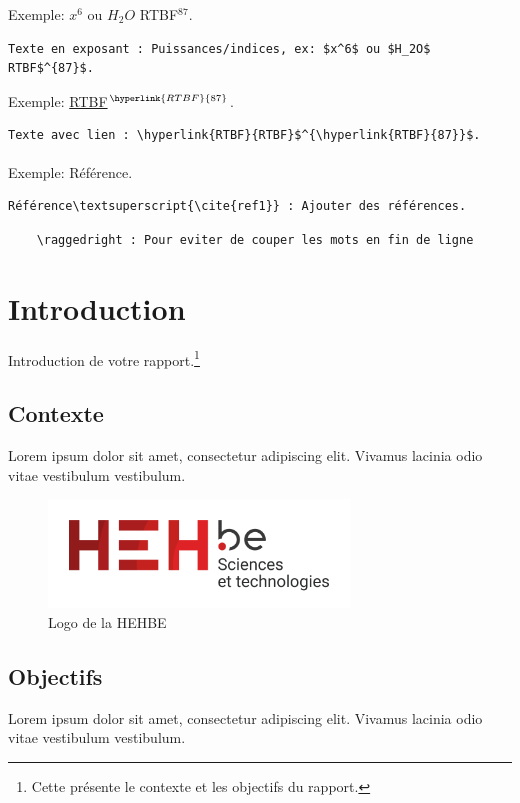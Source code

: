 Exemple: $x^6$ ou $H_2O$ RTBF$^{87}$.
\begin{verbatim}
Texte en exposant : Puissances/indices, ex: $x^6$ ou $H_2O$ RTBF$^{87}$.
\end{verbatim}

Exemple: \hyperlink{RTBF}{RTBF}$^{\hyperlink{RTBF}{87}}$.
\begin{verbatim}
Texte avec lien : \hyperlink{RTBF}{RTBF}$^{\hyperlink{RTBF}{87}}$.
\end{verbatim}

Exemple: Référence\textsuperscript{\cite{ref1}}.
\begin{verbatim}
Référence\textsuperscript{\cite{ref1}} : Ajouter des références.
\end{verbatim}

\begin{verbatim}
    \raggedright : Pour eviter de couper les mots en fin de ligne
\end{verbatim}


\chapter{Introduction}
Introduction de votre rapport.\footnote{Cette présente le contexte et les objectifs du rapport.}

\section{Contexte}
Lorem ipsum dolor sit amet, consectetur adipiscing elit. Vivamus lacinia odio vitae vestibulum vestibulum.

\begin{figure}[!ht]
    \centering
    \includegraphics[width=8cm]{img/logo_hehbe_tech.png}
    \caption{Logo de la HEHBE}
    \label{fig:example_figure}
\end{figure}

\section{Objectifs}
Lorem ipsum dolor sit amet, consectetur adipiscing elit. Vivamus lacinia odio vitae vestibulum vestibulum.

